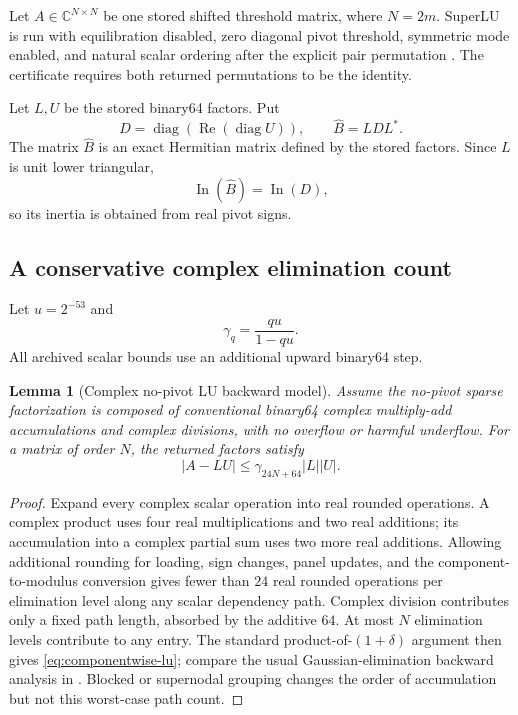 \documentclass[11pt]{article}
\newtheorem{lemma}[theorem]{Lemma}
\theoremstyle{definition}
\theoremstyle{remark}
\newcommand{\C}{\mathbb C}
\newcommand{\Bhat}{\widehat B}
\newcommand{\inn}{\operatorname{In}}
\begin{document}
Let $A\in\C^{N\times N}$ be one stored shifted threshold matrix, where
$N=2m$.  SuperLU is run with equilibration disabled, zero diagonal pivot
threshold, symmetric mode enabled, and natural scalar ordering after the
explicit pair permutation \citep{Davis2006}.  The certificate requires both
returned permutations to be the identity.

Let $L,U$ be the stored binary64 factors.  Put
\begin{equation}
 D=\operatorname{diag}\!\left(\operatorname{Re}(\operatorname{diag}U)\right),
 \qquad
 \Bhat=LDL^*.
 \label{eq:hermitian-center}
\end{equation}
The matrix $\Bhat$ is an exact Hermitian matrix defined by the stored factors.
Since $L$ is unit lower triangular,
\begin{equation}
 \inn(\Bhat)=\inn(D),
 \label{eq:pivot-inertia}
\end{equation}
so its inertia is obtained from real pivot signs.

\subsection{A conservative complex elimination count}

Let $u=2^{-53}$ and
\begin{equation}
 \gamma_q=\frac{qu}{1-qu}.
 \label{eq:gamma}
\end{equation}
All archived scalar bounds use an additional upward binary64 step.

\begin{lemma}[Complex no-pivot LU backward model]
\label{lem:complex-lu}
Assume the no-pivot sparse factorization is composed of conventional
binary64 complex multiply-add accumulations and complex divisions, with no
overflow or harmful underflow.  For a matrix of order $N$, the returned
factors satisfy
\begin{equation}
 |A-LU|
 \leq
 \gamma_{24N+64}|L||U|.
 \label{eq:componentwise-lu}
\end{equation}
\end{lemma}

\begin{proof}
Expand every complex scalar operation into real rounded operations.  A
complex product uses four real multiplications and two real additions; its
accumulation into a complex partial sum uses two more real additions.
Allowing additional rounding for loading, sign changes, panel updates, and
the component-to-modulus conversion gives fewer than $24$ real rounded
operations per elimination level along any scalar dependency path.
Complex division contributes only a fixed path length, absorbed by the
additive $64$.  At most $N$ elimination levels contribute to any entry.
The standard product-of-$(1+\delta)$ argument then gives
\cref{eq:componentwise-lu}; compare the usual Gaussian-elimination backward
analysis in \citep{Higham2002,GolubVanLoan2013}.  Blocked or supernodal
grouping changes the order of accumulation but not this worst-case path
count.
\end{proof}
\end{document}

